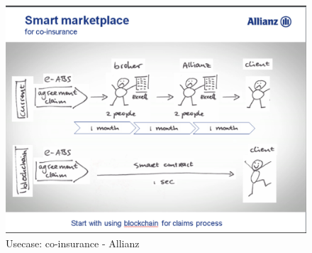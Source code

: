 \begin{figure}[h!]
    \begin{center}
        \includegraphics[scale=0.5]{images/allianz-blockchain}
        \caption{Usecase: co-insurance - Allianz}
        \label{fig:allianz-blockchain}
    \end{center}
\end{figure}